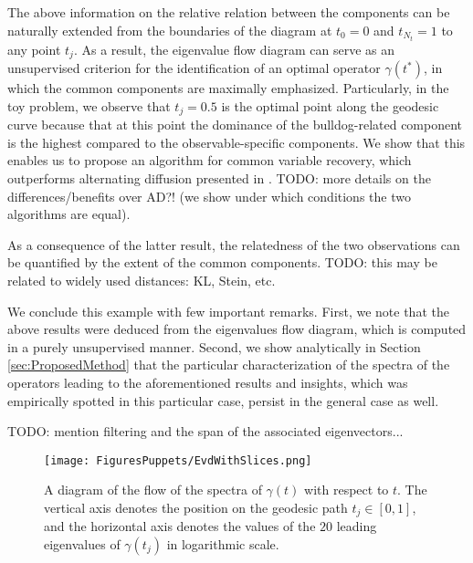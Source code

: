 \documentclass[]{article}
\theoremstyle{definition}
\begin{document}
The above information on the relative relation between the components can be naturally extended from the boundaries of the diagram at $t_0=0$ and $t_{N_t}=1$ to any point $t_j$. As a result, the eigenvalue flow diagram can serve as an unsupervised criterion for the identification of an optimal operator $\gamma(t^*)$, in which the common components are maximally emphasized.
Particularly, in the toy problem, we observe that $t_j=0.5$ is the optimal point along the geodesic curve because that at this point the dominance of the bulldog-related component is the highest compared to the observable-specific components.
We show that this enables us to propose an algorithm for common variable recovery, which outperforms alternating diffusion presented in \cite{lederman2018learning}. TODO: more details on the differences/benefits over AD?! (we show under which conditions the two algorithms are equal).

As a consequence of the latter result, the relatedness of the two observations can be quantified by the extent of the common components. TODO: this may be related to widely used distances: KL, Stein, etc.

We conclude this example with few important remarks.
First, we note that the above results were deduced from the eigenvalues flow diagram, which is computed in a purely unsupervised manner. Second, we show analytically in Section \ref{sec:ProposedMethod} that the particular characterization of the spectra of the operators leading to the aforementioned results and insights, which was empirically spotted in this particular case, persist in the general case as well.  

TODO: mention filtering and the span of the associated eigenvectors...

\begin{figure}[t]
	\centering
	\texttt{[image: FiguresPuppets/EvdWithSlices.png]} 
	\caption {A diagram of the flow of the spectra of $\gamma(t)$ with respect to $t$. The vertical axis denotes the position on the geodesic path $t_j \in [0,1]$, and the horizontal axis denotes the values of the $20$ leading eigenvalues of $\gamma(t_j)$ in logarithmic scale.}
	\label{fig:Puppets_EVDiagrams_Slices}
\end{figure}

	
\end{document}
